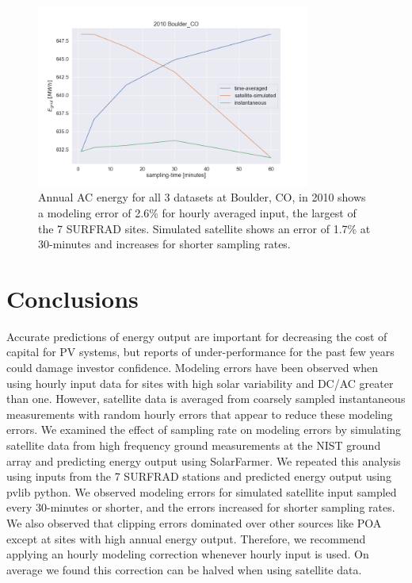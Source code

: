 \documentclass[conference]{IEEEtran}
\begin{document}
\begin{figure}[htbp]
\centerline{\includegraphics[width=9cm]{analysis/tbl2010.png}}
\caption{Annual AC energy for all 3 datasets at Boulder, CO, in 2010 shows a modeling error of 2.6\% for hourly averaged input, the largest of the 7 SURFRAD sites. Simulated satellite shows an error of 1.7\% at 30-minutes and increases for shorter sampling rates.}
\label{fig:tbl2010}
\end{figure}

\section{Conclusions}
Accurate predictions of energy output are important for decreasing the cost of capital for PV systems, but reports of under-performance for the past few years could damage investor confidence. Modeling errors have been observed when using hourly input data for sites with high solar variability and DC/AC greater than one. However, satellite data is averaged from coarsely sampled instantaneous measurements with random hourly errors that appear to reduce these modeling errors. We examined the effect of sampling rate on modeling errors by simulating satellite data from high frequency ground measurements at the NIST ground array and predicting energy output using SolarFarmer. We repeated this analysis using inputs from the 7 SURFRAD stations and predicted energy output using pvlib python. We observed modeling errors for simulated satellite input sampled every 30-minutes or shorter, and the errors increased for shorter sampling rates. We also observed that clipping errors dominated over other sources like POA except at sites with high annual energy output. Therefore, we recommend applying an hourly modeling correction whenever hourly input is used. On average we found this correction can be halved when using satellite data.



\end{document}
